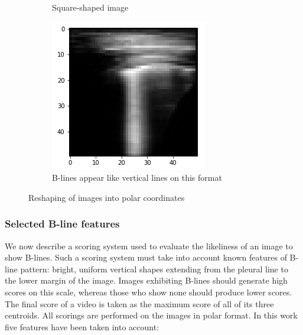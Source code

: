 \documentclass[11pt]{article} %
\begin{document}
\begin{figure}
\begin{subfigure}{0.35\textwidth}
		\caption{Square-shaped image}
		\end{subfigure}
		\begin{subfigure}{0.30\textwidth}
		\includegraphics[width=\textwidth]{figuras/polar.png}
		\caption{B-lines appear like vertical lines on this format}
		\end{subfigure}
	\caption{Reshaping of images into polar coordinates}
	\end{figure}	
	
	
\subsubsection{Selected B-line features}

	We now describe a scoring system used to evaluate the likeliness of an image to show B-lines. Such a scoring system must take into account known features of B-line pattern: bright, uniform vertical shapes extending from the pleural line to the lower margin of the image. Images exhibiting B-lines should generate high scores on this scale, whereas those who show none should produce lower scores. The final score of a video is taken as the maximum score of all of its three centroids. All scorings are performed on the images in polar format. In this work five features have been taken into account:
	
\end{document}
